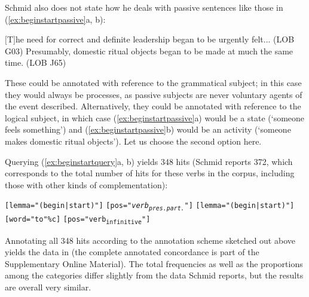 Schmid also does not state how he deals with passive  sentences like those in (\ref{ex:beginstartpassive}a, b):

\begin{exe}
\ex
\begin{xlist}
\label{ex:beginstartpassive}
\ex $[$T$]$he need for correct and definite leadership began to be urgently felt... (LOB G03)
\ex Presumably, domestic ritual objects began to be made at much the same time. (LOB J65)
\end{xlist}
\end{exe}

These could be annotated  with reference to the grammatical subject; in this case they would always be processes,  as passive  subjects are never voluntary agents  of the event described. Alternatively, they could be annotated with reference to the logical subject, in which case (\ref{ex:beginstartpassive}a) would be a state  (`someone feels something') and (\ref{ex:beginstartpassive}b) would be an activity  (`someone makes domestic ritual objects'). Let us choose the second option here.

Querying (\ref{ex:beginstartquery}a, b) yields 348 hits (Schmid reports 372, which corresponds to the total number of hits for these verbs  in the corpus, including those with other kinds of  complementation):

\begin{exe}
\ex
\begin{xlist}
\label{ex:beginstartquery}
\ex \texttt{[lemma="(begin|start)"]} \texttt{[pos="\textit{verb\textsubscript{pres.part.}}"]} 
\ex \texttt{[lemma="(begin|start)"]} \texttt{[word="to"\%c]} \texttt{[pos="verb\textsubscript{infinitive}"]} 
\end{xlist}
\end{exe}

Annotating  all 348 hits according to the annotation scheme sketched out above yields the data in  (the complete annotated  concordance  is part of the Supplementary Online Material). The total frequencies  as well as the proportions among the categories  differ slightly from the data Schmid reports, but the results are overall very similar.

